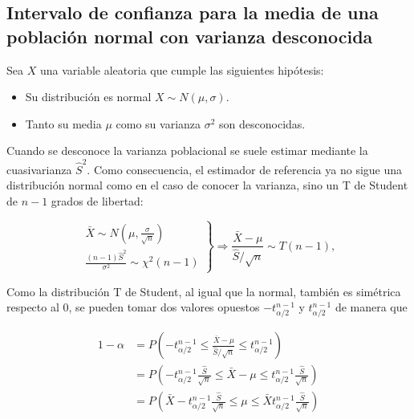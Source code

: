 \documentclass[
  a4paper,
]{scrreport}
\providecommand{\tightlist}{%
  \setlength{\itemsep}{0pt}\setlength{\parskip}{0pt}}\usepackage{longtable,booktabs,array}
\theoremstyle{plain}
\theoremstyle{definition}
\theoremstyle{definition}
\theoremstyle{remark}
\begin{document}
\hypertarget{intervalo-de-confianza-para-la-media-de-una-poblaciuxf3n-normal-con-varianza-desconocida}{%
\subsection{Intervalo de confianza para la media de una población normal
con varianza
desconocida}\label{intervalo-de-confianza-para-la-media-de-una-poblaciuxf3n-normal-con-varianza-desconocida}}

Sea \(X\) una variable aleatoria que cumple las siguientes hipótesis:

\begin{itemize}
\tightlist
\item
  Su distribución es normal \(X\sim N(\mu,\sigma)\).
\item
  Tanto su media \(\mu\) como su varianza \(\sigma^2\) son desconocidas.
\end{itemize}

Cuando se desconoce la varianza poblacional se suele estimar mediante la
cuasivarianza \(\hat{S}^2\). Como consecuencia, el estimador de
referencia ya no sigue una distribución normal como en el caso de
conocer la varianza, sino un T de Student de \(n-1\) grados de libertad:

\[
\left.
\begin{array}{l}
\bar X \sim N\left(\mu,\frac{\sigma}{\sqrt{n}}\right)\\
\displaystyle\frac{(n-1)\hat{S}^2}{\sigma^2}\sim \chi^2(n-1)
\end{array}
\right\}
\Rightarrow
\frac{\bar X -\mu}{\hat{S}/\sqrt{n}}\sim T(n-1),
\]

Como la distribución T de Student, al igual que la normal, también es
simétrica respecto al 0, se pueden tomar dos valores opuestos
\(-t^{n-1}_{\alpha/2}\) y \(t^{n-1}_{\alpha/2}\) de manera que

\begin{align*}
1-\alpha 
&= P\left(-t^{n-1}_{\alpha/2}\leq \frac{\bar X -\mu}{\hat{S}/\sqrt{n}} \leq t^{n-1}_{\alpha/2}\right)\\
&= P\left(-t^{n-1}_{\alpha/2}\frac{\hat{S}}{\sqrt{n}}\leq \bar X -\mu \leq t^{n-1}_{\alpha/2}\frac{\hat{S}}{\sqrt{n}}\right)\\
&= P\left(\bar X-t^{n-1}_{\alpha/2}\frac{\hat{S}}{\sqrt{n}}\leq \mu \leq \bar X t^{n-1}_{\alpha/2}\frac{\hat{S}}{\sqrt{n}}\right)
\end{align*}
\end{document}
